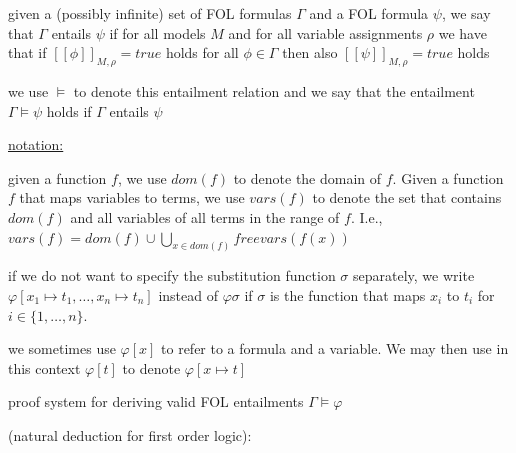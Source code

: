 \documentclass[landscape, a4paper]{article}
\begin{document}
\begin{minipage}[t]{0.2\linewidth}
\begin{betterlist}
		\item given a (possibly infinite) set of FOL formulas $\Gamma$ and a FOL formula $\psi$, we say that $\Gamma$ \alert{entails} $\psi$ if for all models $M$ and for all variable assignments $\rho$ we have that if $[[\phi]]_{M,\rho} = true$ holds for all $\phi \in \Gamma$ then also $[[\psi]]_{M,\rho} = true$ holds
		\begin{betterlist}
			\item we use $\models$ to denote this entailment relation and we say that \alert{the entailment $\Gamma \models \psi$ holds} if $\Gamma$ entails $\psi$
		\end{betterlist}
		\item {}
		\item {}
		\begin{betterlist}
			\item \underline{notation:}
			\begin{betterlist}
				\item given a function $f$, we use $dom(f)$ to denote the domain of $f$. Given a function $f$ that maps variables to terms, we use $vars(f)$ to denote the set that contains $dom(f)$ and all variables of all terms in the range of $f$. I.e., $\displaystyle vars(f) = dom(f) \cup \bigcup_{x\in dom(f)} freevars(f(x))$
				\item if we do not want to specify the substitution function $\sigma$ separately, we write $\varphi[x_1 \mapsto t_1, \ldots, x_n \mapsto t_n ]$ instead of $\varphi\sigma$ if $\sigma$ is the function that maps $x_i$ to $t_i$ for $i \in \{1, \ldots , n\}$.
				\item we sometimes use $\varphi[x]$ to refer to a formula and a variable. We may then use in this context $\varphi[t]$ to denote $\varphi[x \mapsto t]$
			\end{betterlist}
		\end{betterlist}
	\end{betterlist}
	\fbox{FOL Proof system ($N_{FOL}$)}
	\begin{betterlist}
		\item proof system for deriving valid FOL entailments $\Gamma \models \varphi$
		\item {} (natural deduction for first order logic):


\end{betterlist}
\end{minipage}
\end{document}
